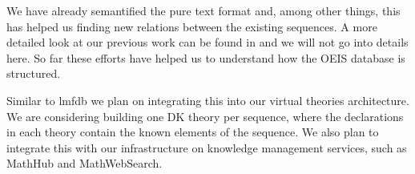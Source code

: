 We have already semantified the pure text format and, among other things, this has helped
us finding new relations between the existing sequences. A more detailed look at our
previous work can be found in \cite{LuzKoh:fsarfo16} and we will not go into details
here. So far these efforts have helped us to understand how the OEIS database is
structured.

Similar to lmfdb we plan on integrating this into our virtual theories architecture. We
are considering building one DK theory per sequence, where the declarations in each theory
contain the known elements of the sequence. We also plan to integrate this with our
infrastructure on knowledge management services, such as MathHub and MathWebSearch.




